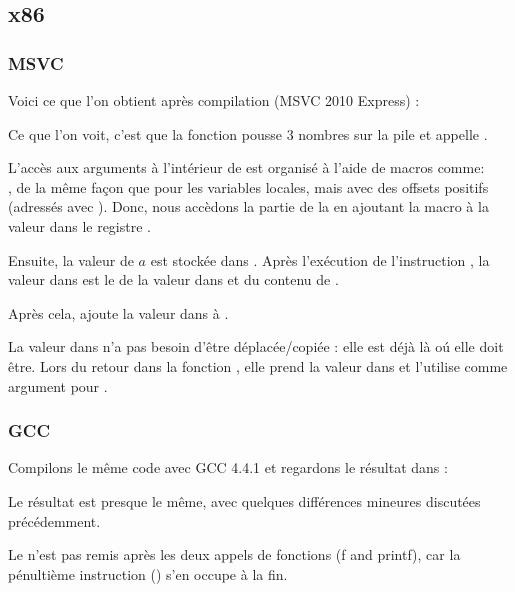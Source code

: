\subsection{x86}

\subsubsection{MSVC}

Voici ce que l'on obtient après compilation (MSVC 2010 Express) :




Ce que l'on voit, c'est que la fonction \main pousse 3 nombres sur la pile et appelle
.

L'accès aux arguments à l'intérieur de \ttf est organisé à l'aide de macros
comme:\\
,
de la même façon que pour les variables locales, mais avec des offsets positifs
(adressés avec ).
Donc, nous accèdons la partie  de la 
en ajoutant la macro  à la valeur dans le registre \EBP.


Ensuite, la valeur de $a$ est stockée dans \EAX. Après l'exécution de l'instruction
\IMUL, la valeur dans \EAX est le  de la valeur dans \EAX
et du contenu de .

Après cela, \ADD ajoute la valeur dans  à \EAX.

La valeur dans \EAX n'a pas besoin d'être déplacée/copiée : elle est déjà là
oú elle doit être.
Lors du retour dans la fonction , elle prend la valeur dans
\EAX et l'utilise comme argument pour \printf.



\subsubsection{GCC}

Compilons le même code avec GCC 4.4.1 et regardons le résultat dans \IDA :



Le résultat est presque le même, avec quelques différences mineures discutées
précédemment.

Le  n'est pas remis après les deux appels
de fonctions (f and printf), car la pénultième instruction  ()
s'en occupe à la fin.

